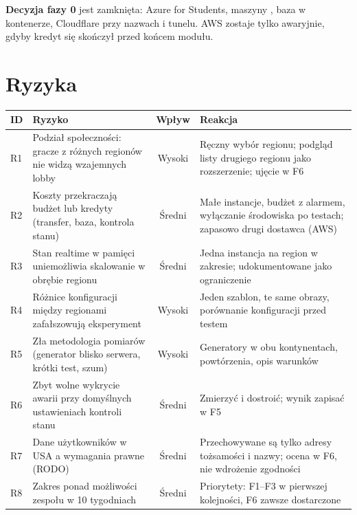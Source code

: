 \documentclass[12pt,a4paper]{article}
\newcommand{\code}[1]{\texttt{\detokenize{#1}}}
\begin{document}
\textbf{Decyzja fazy 0} jest zamknięta: Azure for Students, maszyny
\code{Standard_B2ats_v2}, baza w kontenerze, Cloudflare przy nazwach i tunelu.
AWS zostaje tylko awaryjnie, gdyby kredyt się skończył przed końcem modułu.

\section{Ryzyka}
\begin{table}[H]
\centering\footnotesize
\begin{tabularx}{\textwidth}{@{}lYcY@{}}
\toprule
\textbf{ID} & \textbf{Ryzyko} & \textbf{Wpływ} & \textbf{Reakcja} \\
\midrule
R1 & Podział społeczności: gracze z różnych regionów nie widzą wzajemnych lobby & Wysoki & Ręczny wybór regionu; podgląd listy drugiego regionu jako rozszerzenie; ujęcie w F6 \\
R2 & Koszty przekraczają budżet lub kredyty (transfer, baza, kontrola stanu) & Średni & Małe instancje, budżet z alarmem, wyłączanie środowiska po testach; zapasowo drugi dostawca (AWS) \\
R3 & Stan realtime w pamięci uniemożliwia skalowanie w obrębie regionu & Średni & Jedna instancja na region w zakresie; udokumentowane jako ograniczenie \\
R4 & Różnice konfiguracji między regionami zafałszowują eksperyment & Wysoki & Jeden szablon, te same obrazy, porównanie konfiguracji przed testem \\
R5 & Zła metodologia pomiarów (generator blisko serwera, krótki test, szum) & Wysoki & Generatory w obu kontynentach, powtórzenia, opis warunków \\
R6 & Zbyt wolne wykrycie awarii przy domyślnych ustawieniach kontroli stanu & Średni & Zmierzyć i dostroić; wynik zapisać w F5 \\
R7 & Dane użytkowników w USA a wymagania prawne (RODO) & Średni & Przechowywane są tylko adresy tożsamości i nazwy; ocena w F6, nie wdrożenie zgodności \\
R8 & Zakres ponad możliwości zespołu w 10 tygodniach & Średni & Priorytety: F1--F3 w pierwszej kolejności, F6 zawsze dostarczone \\
\bottomrule
\end{tabularx}
\end{table}

\end{document}
